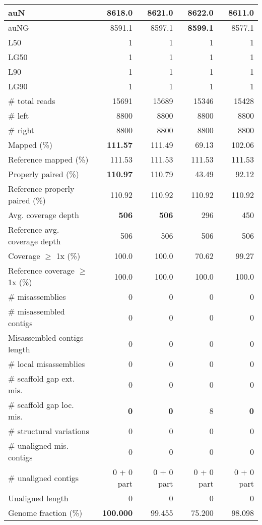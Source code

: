 \documentclass[12pt,a4paper]{article}
\begin{document}
\begin{table}[ht]
\begin{center}
\begin{tabular}{|l*{4}{|r}|}
auN & 8618.0 & 8621.0 & {\bf 8622.0} & 8611.0 \\ \hline
auNG & 8591.1 & 8597.1 & {\bf 8599.1} & 8577.1 \\ \hline
L50 & 1 & 1 & 1 & 1 \\ \hline
LG50 & 1 & 1 & 1 & 1 \\ \hline
L90 & 1 & 1 & 1 & 1 \\ \hline
LG90 & 1 & 1 & 1 & 1 \\ \hline
\# total reads & 15691 & 15689 & 15346 & 15428 \\ \hline
\# left & 8800 & 8800 & 8800 & 8800 \\ \hline
\# right & 8800 & 8800 & 8800 & 8800 \\ \hline
Mapped (\%) & {\bf 111.57} & 111.49 & 69.13 & 102.06 \\ \hline
Reference mapped (\%) & 111.53 & 111.53 & 111.53 & 111.53 \\ \hline
Properly paired (\%) & {\bf 110.97} & 110.79 & 43.49 & 92.12 \\ \hline
Reference properly paired (\%) & 110.92 & 110.92 & 110.92 & 110.92 \\ \hline
Avg. coverage depth & {\bf 506} & {\bf 506} & 296 & 450 \\ \hline
Reference avg. coverage depth & 506 & 506 & 506 & 506 \\ \hline
Coverage $\geq$ 1x (\%) & 100.0 & 100.0 & 70.62 & 99.27 \\ \hline
Reference coverage $\geq$ 1x (\%) & 100.0 & 100.0 & 100.0 & 100.0 \\ \hline
\# misassemblies & 0 & 0 & 0 & 0 \\ \hline
\# misassembled contigs & 0 & 0 & 0 & 0 \\ \hline
Misassembled contigs length & 0 & 0 & 0 & 0 \\ \hline
\# local misassemblies & 0 & 0 & 0 & 0 \\ \hline
\# scaffold gap ext. mis. & 0 & 0 & 0 & 0 \\ \hline
\# scaffold gap loc. mis. & {\bf 0} & {\bf 0} & 8 & {\bf 0} \\ \hline
\# structural variations & 0 & 0 & 0 & 0 \\ \hline
\# unaligned mis. contigs & 0 & 0 & 0 & 0 \\ \hline
\# unaligned contigs & 0 + 0 part & 0 + 0 part & 0 + 0 part & 0 + 0 part \\ \hline
Unaligned length & 0 & 0 & 0 & 0 \\ \hline
Genome fraction (\%) & {\bf 100.000} & 99.455 & 75.200 & 98.098 \\ \hline

\end{tabular}
\end{center}
\end{table}
\end{document}
